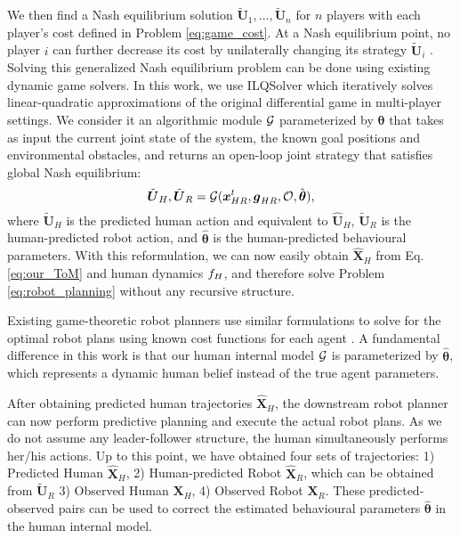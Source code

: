 We then find a Nash equilibrium solution $\tilde{\boldsymbol{U}}_{1}, \dots, \tilde{\boldsymbol{U}}_{n}$ for $n$ players with each player's cost defined in Problem \eqref{eq:game_cost}.
At a Nash equilibrium point, no player $i$ can further decrease its cost by unilaterally changing its strategy $\tilde{\boldsymbol{U}}_{i}$ \cite{facchinei2010generalized}. 
Solving this generalized Nash equilibrium problem can be done using existing dynamic game solvers. In this work, we use ILQSolver \cite{fridovich2020efficient} which iteratively solves linear-quadratic approximations of the original differential game in multi-player settings. 
We consider it an algorithmic module $\mathcal{G}$ parameterized by $\boldsymbol{\theta}$ that takes as input the current joint state of the system, the known goal positions and environmental obstacles, and returns an open-loop joint strategy that satisfies global Nash equilibrium:
\begin{equation}
\label{eq:our_ToM}
    \tilde{\boldsymbol{U}}_{H}, \tilde{\boldsymbol{U}}_{R} = \mathcal{G}(\boldsymbol{x}_{HR}^{t}, \boldsymbol{g}_{HR}, \mathcal{O}, \hat{\boldsymbol{\theta}}),
\end{equation}
where $\tilde{\boldsymbol{U}}_{H}$ is the predicted human action and equivalent to $\boldsymbol{\hat{U}}_{H}$, 
$\tilde{\boldsymbol{U}}_{R}$ is the human-predicted robot action, 
and $\hat{\boldsymbol{\theta}}$ is the human-predicted behavioural parameters. 
With this reformulation, we can now easily obtain $\hat{\boldsymbol{X}}_{H}$ from Eq. \eqref{eq:our_ToM} and human dynamics $f_{H}$, and therefore solve Problem \eqref{eq:robot_planning} without any recursive structure.

Existing game-theoretic robot planners use similar formulations to solve for the optimal robot plans using known cost functions for each agent \cite{tian2022safety, le2021lucidgames, hu2023emergent}. 
A fundamental difference in this work is that our human internal model $\mathcal{G}$ is parameterized by $\hat{\boldsymbol{\theta}}$, which represents a dynamic human belief instead of the true agent parameters.

After obtaining predicted human trajectories $\hat{\boldsymbol{X}}_{H}$, the downstream robot planner can now perform predictive planning and execute the actual robot plans. 
As we do not assume any leader-follower structure, the human simultaneously performs her/his actions. 
Up to this point, we have obtained four sets of trajectories: 
1) Predicted Human $\hat{\boldsymbol{X}}_{H}$, 
2) Human-predicted Robot $\hat{\boldsymbol{X}}_{R}$, which can be obtained from $\tilde{\boldsymbol{U}}_{R}$
3) Observed Human $\boldsymbol{X}_{H}$, 
4) Observed Robot $\boldsymbol{X}_{R}$. 
These predicted-observed pairs can be used to correct the estimated behavioural parameters $\hat{\boldsymbol{\theta}}$ in the human internal model.

